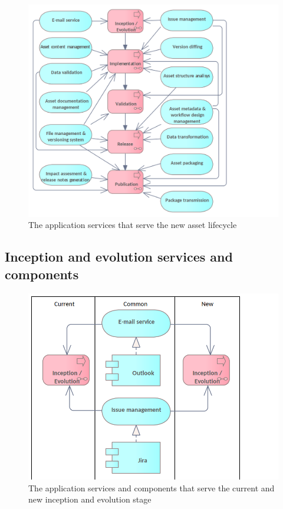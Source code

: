	\begin{figure}[h]
		\centering
		\includegraphics[width=.9\textwidth]{images/application/Application Services (new).png}
		\caption{The application services that serve the new asset lifecycle}
		\label{fig:application-new}
	\end{figure}	
	
	\subsection{Inception and evolution services and components}
	\label{sec:evolution-application}	
	\begin{figure}[h]
		\centering
		\includegraphics[width=.6\textwidth]{images/application/InceptionEvolution.png}
		\caption{The application services and components that serve the current and new inception and evolution stage}
		\label{fig:application-inception-evolution}
	\end{figure}

